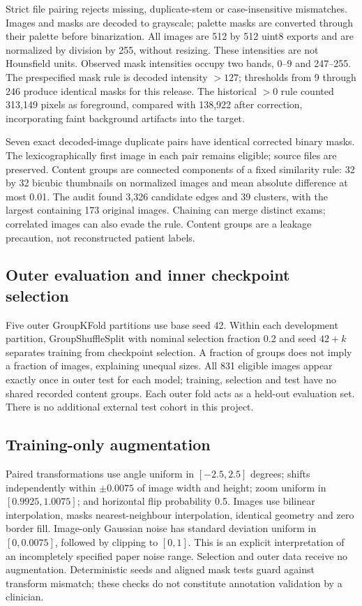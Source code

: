 \documentclass[a4paper,fleqn]{cas-sc}
\begin{document}

Strict file pairing rejects missing, duplicate-stem or case-insensitive mismatches. Images and masks are decoded to grayscale; palette masks are converted through their palette before binarization. All images are 512 by 512 uint8 exports and are normalized by division by 255, without resizing. These intensities are not Hounsfield units. Observed mask intensities occupy two bands, 0--9 and 247--255. The prespecified mask rule is decoded intensity $>127$; thresholds from 9 through 246 produce identical masks for this release. The historical $>0$ rule counted 313,149 pixels as foreground, compared with 138,922 after correction, incorporating faint background artifacts into the target.

Seven exact decoded-image duplicate pairs have identical corrected binary masks. The lexicographically first image in each pair remains eligible; source files are preserved. Content groups are connected components of a fixed similarity rule: 32 by 32 bicubic thumbnails on normalized images and mean absolute difference at most 0.01. The audit found 3,326 candidate edges and 39 clusters, with the largest containing 173 original images. Chaining can merge distinct exams; correlated images can also evade the rule. Content groups are a leakage precaution, not reconstructed patient labels.

\subsection{Outer evaluation and inner checkpoint selection}
Five outer GroupKFold partitions use base seed 42. Within each development partition, GroupShuffleSplit with nominal selection fraction 0.2 and seed $42+k$ separates training from checkpoint selection. A fraction of groups does not imply a fraction of images, explaining unequal sizes. All 831 eligible images appear exactly once in outer test for each model; training, selection and test have no shared recorded content groups. Each outer fold acts as a held-out evaluation set. There is no additional external test cohort in this project.


\subsection{Training-only augmentation}
Paired transformations use angle uniform in $[-2.5,2.5]$ degrees; shifts independently within $\pm0.0075$ of image width and height; zoom uniform in $[0.9925,1.0075]$; and horizontal flip probability 0.5. Images use bilinear interpolation, masks nearest-neighbour interpolation, identical geometry and zero border fill. Image-only Gaussian noise has standard deviation uniform in $[0,0.0075]$, followed by clipping to $[0,1]$. This is an explicit interpretation of an incompletely specified paper noise range. Selection and outer data receive no augmentation. Deterministic seeds and aligned mask tests guard against transform mismatch; these checks do not constitute annotation validation by a clinician.
\end{document}
